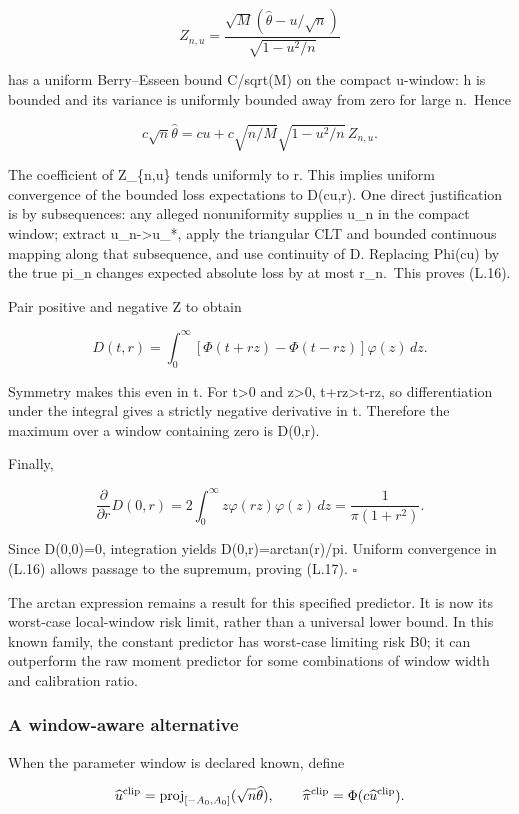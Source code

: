 \[
Z_{n,u}=\frac{\sqrt M(\widehat\theta-u/\sqrt n)}
 {\sqrt{1-u^2/n}}
\]

has a uniform Berry--Esseen bound C/sqrt(M) on the compact u-window: h
is bounded and its variance is uniformly bounded away from zero for
large n.~Hence

\[
c\sqrt n\widehat\theta
=cu+c\sqrt{n/M}\sqrt{1-u^2/n}\,Z_{n,u}.
\]

The coefficient of Z\_\{n,u\} tends uniformly to r. This implies uniform
convergence of the bounded loss expectations to D(cu,r). One direct
justification is by subsequences: any alleged nonuniformity supplies
u\_n in the compact window; extract u\_n-\textgreater u\_*, apply the
triangular CLT and bounded continuous mapping along that subsequence,
and use continuity of D. Replacing Phi(cu) by the true pi\_n changes
expected absolute loss by at most r\_n.~This proves (L.16).

Pair positive and negative Z to obtain

\[
D(t,r)=\int_0^\infty
 [\Phi(t+rz)-\Phi(t-rz)]\varphi(z)\,dz.
\tag{L.18}
\]

Symmetry makes this even in t. For t\textgreater0 and z\textgreater0,
\textbar t+rz\textbar\textgreater\textbar t-rz\textbar, so
differentiation under the integral gives a strictly negative derivative
in t. Therefore the maximum over a window containing zero is D(0,r).

Finally,

\[
\frac{\partial}{\partial r}D(0,r)
=2\int_0^\infty z\varphi(rz)\varphi(z)\,dz
=\frac1{\pi(1+r^2)}.
\]

Since D(0,0)=0, integration yields D(0,r)=arctan(r)/pi. Uniform
convergence in (L.16) allows passage to the supremum, proving (L.17). \(\square\)

The arctan expression remains a result for this specified predictor. It
is now its worst-case local-window risk limit, rather than a universal
lower bound. In this known family, the constant predictor has worst-case
limiting risk B0; it can outperform the raw moment predictor for some
combinations of window width and calibration ratio.

\subsubsection{A window-aware
alternative}\label{local_prediction-a-window-aware-alternative}

When the parameter window is declared known, define

\[
\widehat u^{\rm clip}=\operatorname{proj}_{[-A_0,A_0]}(\sqrt n\widehat\theta),
\qquad \widehat\pi^{\rm clip}=\Phi(c\widehat u^{\rm clip}).
\]

